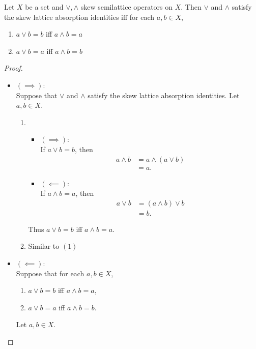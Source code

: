 \documentclass{book}
\begin{document}
	\begin{ex} 
		Let $X$ be a set and $\vee, \wedge$ skew semilattice operators on $X$. Then $\vee$ and $\wedge$ satisfy the skew lattice absorption identities iff for each $a,b \in X$,
		\begin{enumerate}
			\item $a \vee b = b$ iff $a \wedge b = a$
			\item $a \vee b = a$ iff $a \wedge b = b$
		\end{enumerate}
	\end{ex}
	
	\begin{proof}\
		\begin{itemize}
			\item $(\implies)$: \\
			Suppose that $\vee$ and $\wedge$ satisfy the skew lattice absorption identities. Let $a, b \in X$. 
			\begin{enumerate}
				\item 
				\begin{itemize}
					\item $(\implies)$: \\
					If $a \vee b = b$, then 
					\begin{align*}
						a \wedge b
						& = a \wedge (a \vee b) \\
						& = a.
					\end{align*}
					\item $(\impliedby)$: \\
					If $a \wedge b = a$, then 
					\begin{align*}
						a \vee b
						& = (a \wedge b) \vee b \\
						& = b.
					\end{align*}
				\end{itemize}
				Thus $a \vee b = b$ iff $a \wedge b = a$.
				\item Similar to $(1)$
			\end{enumerate}
			\item $(\impliedby)$: \\
			Suppose that for each $a,b \in X$,
			\begin{enumerate}
				\item $a \vee b = b$ iff $a \wedge b = a$,
				\item $a \vee b = a$ iff $a \wedge b = b$.
			\end{enumerate}
			Let $a, b \in X$.
			\begin{enumerate}

\end{enumerate}
\end{itemize}
\end{proof}
\end{document}
